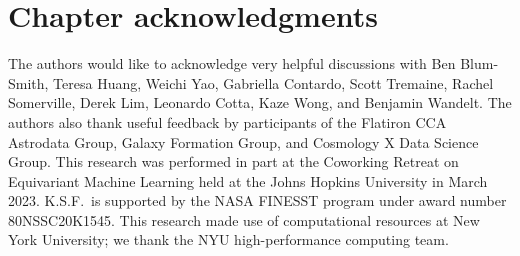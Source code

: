 \section{Chapter acknowledgments}
The authors would like to acknowledge very helpful discussions with Ben Blum-Smith, Teresa Huang, Weichi Yao, Gabriella Contardo, Scott Tremaine, Rachel Somerville, Derek Lim, Leonardo Cotta, Kaze Wong, and Benjamin Wandelt.
The authors also thank useful feedback by participants of the Flatiron CCA Astrodata Group, Galaxy Formation Group, and Cosmology X Data Science Group.
This research was performed in part at the Coworking Retreat on Equivariant Machine Learning held at the Johns Hopkins University in March 2023.
K.S.F.~is supported by the NASA FINESST program under award number 80NSSC20K1545.
This research made use of computational resources at New York University; we thank the NYU high-performance computing team.